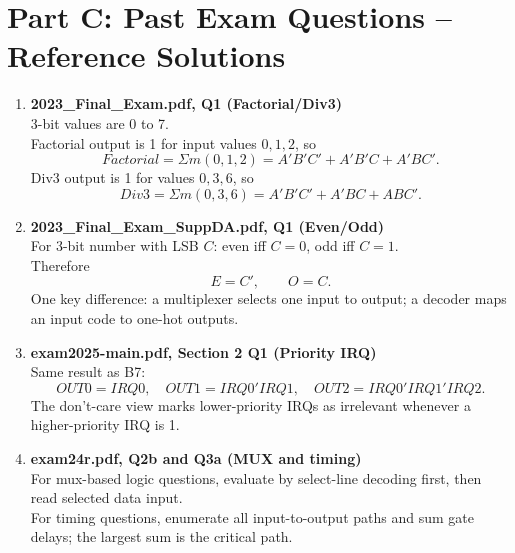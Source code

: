 \documentclass[11pt]{article}
\begin{document}
\section*{Part C: Past Exam Questions -- Reference Solutions}
\begin{enumerate}[label=\textbf{C\arabic*.}]
  \item \textbf{2023\_Final\_Exam.pdf, Q1 (Factorial/Div3)}\\
  3-bit values are 0 to 7.\\
  Factorial output is 1 for input values \(0,1,2\), so
  \[
  Factorial = \Sigma m(0,1,2)=A'B'C' + A'B'C + A'BC'.
  \]
  Div3 output is 1 for values \(0,3,6\), so
  \[
  Div3 = \Sigma m(0,3,6)=A'B'C' + A'BC + ABC'.
  \]

  \item \textbf{2023\_Final\_Exam\_SuppDA.pdf, Q1 (Even/Odd)}\\
  For 3-bit number with LSB \(C\): even iff \(C=0\), odd iff \(C=1\).\\
  Therefore
  \[
  E=C',\qquad O=C.
  \]
  One key difference: a multiplexer selects one input to output; a decoder maps an input code to one-hot outputs.

  \item \textbf{exam2025-main.pdf, Section 2 Q1 (Priority IRQ)}\\
  Same result as B7:
  \[
  OUT0=IRQ0,\quad OUT1=IRQ0'IRQ1,\quad OUT2=IRQ0'IRQ1'IRQ2.
  \]
  The don't-care view marks lower-priority IRQs as irrelevant whenever a higher-priority IRQ is 1.

  \item \textbf{exam24r.pdf, Q2b and Q3a (MUX and timing)}\\
  For mux-based logic questions, evaluate by select-line decoding first, then read selected data input.\\
  For timing questions, enumerate all input-to-output paths and sum gate delays; the largest sum is the critical path.
\end{enumerate}
\end{document}
